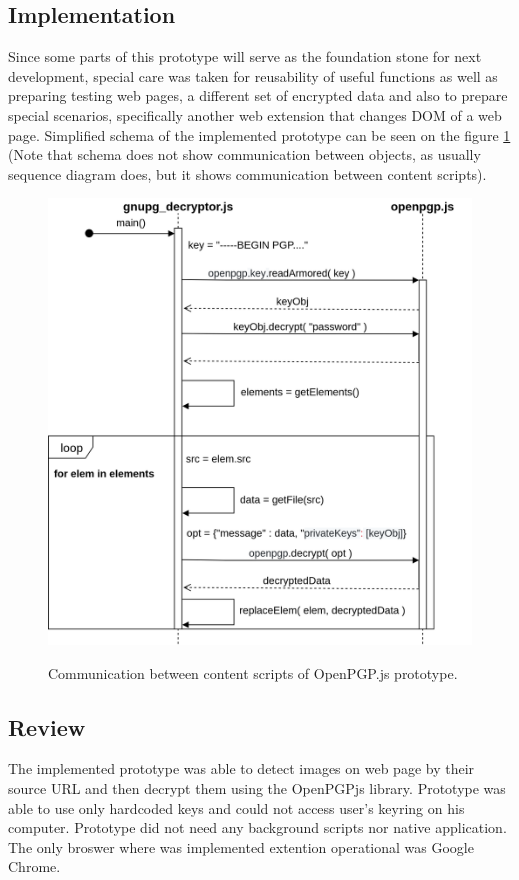 \subsection{Implementation}
Since some parts of this prototype will serve as the foundation stone for next development, special care was taken for reusability of useful functions as well as preparing testing web pages, a different set of encrypted data and also to prepare special scenarios, specifically another web extension that changes DOM of a web page. Simplified schema of the implemented prototype can be seen on the figure \ref{img:openpgp-sequence} (Note that schema does not show communication between objects, as usually sequence diagram does, but it shows communication between content scripts).
\begin{figure}[H]
    \begin{center}
        \label{img:openpgp-sequence}
        \includegraphics[width=1.0\textwidth]{obrazky-figures/openpgp-sequence.png}
        \caption{Communication between content scripts of OpenPGP.js prototype.}
    \end{center}
\end{figure}


\subsection{Review}
The implemented prototype was able to detect images on web page by their source URL and then decrypt them using the OpenPGPjs library. Prototype was able to use only hardcoded keys and could not access user's keyring on his computer. Prototype did not need any background scripts nor native application. The only broswer where was implemented extention operational was Google Chrome.

